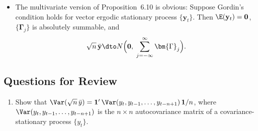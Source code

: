 \begin{itemize}
\item The multivariate version of Proposition~6.10 is obvious: Suppose Gordin's condition
holds for vector ergodic stationary process $\{\mathbf{y}_t\}$. Then $\E(\mathbf{y}_t) = \mathbf{0}$, $\{\bm{\Gamma}_j\}$ is
absolutely summable, and
\begin{equation}
  \sqrt{n}\,\bar{\mathbf{y}} \dto N\Bigl(\mathbf{0},\; \sum_{j=-\infty}^{\infty} \bm{\Gamma}_j\Bigr).
  \label{eq:6.5.8}
\end{equation}
\end{itemize}

\subsection*{Questions for Review}

\begin{enumerate}
\item Show that $\Var(\sqrt{n}\,\bar{y}) = \mathbf{1}'\,\Var(y_t, y_{t-1}, \ldots, y_{t-n+1})\,\mathbf{1}/n$, where $\Var(y_t,
y_{t-1}, \ldots, y_{t-n+1})$ is the $n \times n$ autocovariance matrix of a covariance-stationary
process $\{y_t\}$.
\end{enumerate}
